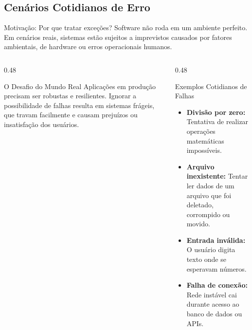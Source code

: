 \documentclass[9pt]{beamer}
\begin{document}
\subsection{Cenários Cotidianos de Erro}
\begin{frame}{Motivação: Por que tratar exceções?}
    Software não roda em um ambiente perfeito. Em cenários reais, sistemas estão sujeitos a imprevistos causados por fatores ambientais, de hardware ou erros operacionais humanos.
    
    \vspace{0.3cm}
    
    \begin{columns}[t]
        \begin{column}{0.48\textwidth}
            \begin{block}{O Desafio do Mundo Real}
                Aplicações em produção precisam ser robustas e resilientes. Ignorar a possibilidade de falhas resulta em sistemas frágeis, que travam facilmente e causam prejuízos ou insatisfação dos usuários.
            \end{block}
        \end{column}
        
        \begin{column}{0.48\textwidth}
            \begin{block}{Exemplos Cotidianos de Falhas}
                \small
                \begin{itemize}
                    \item \textbf{Divisão por zero:} Tentativa de realizar operações matemáticas impossíveis.
                    \item \textbf{Arquivo inexistente:} Tentar ler dados de um arquivo que foi deletado, corrompido ou movido.
                    \item \textbf{Entrada inválida:} O usuário digita texto onde se esperavam números.
                    \item \textbf{Falha de conexão:} Rede instável cai durante acesso ao banco de dados ou APIs.
                \end{itemize}
            \end{block}
        \end{column}
    \end{columns}
\end{frame}
\end{document}
